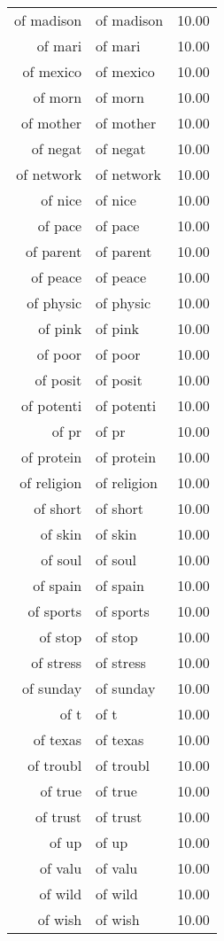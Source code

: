 \begin{table}[ht]
\begin{tabular}{rlr}
  of madison & of madison & 10.00 \\ 
  of mari & of mari & 10.00 \\ 
  of mexico & of mexico & 10.00 \\ 
  of morn & of morn & 10.00 \\ 
  of mother & of mother & 10.00 \\ 
  of negat & of negat & 10.00 \\ 
  of network & of network & 10.00 \\ 
  of nice & of nice & 10.00 \\ 
  of pace & of pace & 10.00 \\ 
  of parent & of parent & 10.00 \\ 
  of peace & of peace & 10.00 \\ 
  of physic & of physic & 10.00 \\ 
  of pink & of pink & 10.00 \\ 
  of poor & of poor & 10.00 \\ 
  of posit & of posit & 10.00 \\ 
  of potenti & of potenti & 10.00 \\ 
  of pr & of pr & 10.00 \\ 
  of protein & of protein & 10.00 \\ 
  of religion & of religion & 10.00 \\ 
  of short & of short & 10.00 \\ 
  of skin & of skin & 10.00 \\ 
  of soul & of soul & 10.00 \\ 
  of spain & of spain & 10.00 \\ 
  of sports & of sports & 10.00 \\ 
  of stop & of stop & 10.00 \\ 
  of stress & of stress & 10.00 \\ 
  of sunday & of sunday & 10.00 \\ 
  of t & of t & 10.00 \\ 
  of texas & of texas & 10.00 \\ 
  of troubl & of troubl & 10.00 \\ 
  of true & of true & 10.00 \\ 
  of trust & of trust & 10.00 \\ 
  of up & of up & 10.00 \\ 
  of valu & of valu & 10.00 \\ 
  of wild & of wild & 10.00 \\ 
  of wish & of wish & 10.00 \\ 

\end{tabular}
\end{table}
